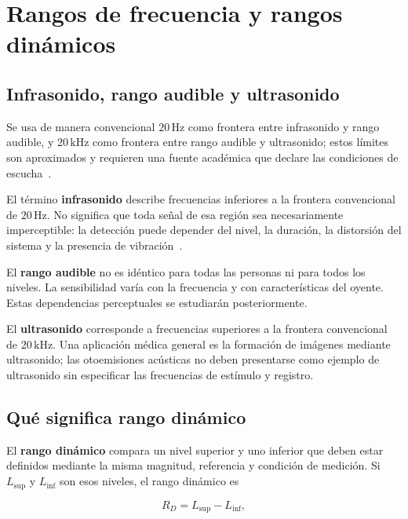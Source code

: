 \section{Rangos de frecuencia y rangos dinámicos}
\label{sec:u5-rangos}

\subsection{Infrasonido, rango audible y ultrasonido}
\label{sec:u5-infra-audible-ultra}

Se usa de manera convencional \(20\,\text{Hz}\) como frontera entre
infrasonido y rango audible, y \(20\,\text{kHz}\) como frontera entre rango
audible y ultrasonido; estos límites son aproximados y requieren una fuente
académica que declare las condiciones de escucha~\cite{oxenham2018,iso226_2023}.

El término \textbf{infrasonido} describe frecuencias inferiores a la frontera
convencional de \(20\,\text{Hz}\). No significa que toda señal de esa región
sea necesariamente imperceptible: la detección puede depender del
nivel, la duración, la distorsión del sistema y la presencia de vibración~\cite{oxenham2018,iso226_2023}.

El \textbf{rango audible} no es idéntico para todas las personas ni para todos
los niveles. La sensibilidad varía con la frecuencia y con características
del oyente. Estas dependencias perceptuales se estudiarán posteriormente.

El \textbf{ultrasonido} corresponde a frecuencias superiores a la frontera
convencional de \(20\,\text{kHz}\). Una aplicación médica general es la
formación de imágenes mediante ultrasonido; las otoemisiones acústicas no
deben presentarse como ejemplo de ultrasonido sin especificar las frecuencias
de estímulo y registro.

\subsection{Qué significa rango dinámico}
\label{sec:u5-rango-dinamico}

El \textbf{rango dinámico} compara un nivel superior y uno inferior que deben
estar definidos mediante la misma magnitud, referencia y condición de
medición. Si \(L_\mathrm{sup}\) y \(L_\mathrm{inf}\) son esos niveles, el
rango dinámico es

\begin{equation}
    R_D=L_\mathrm{sup}-L_\mathrm{inf},
    \label{eq:u5-rango-dinamico}
\end{equation}

